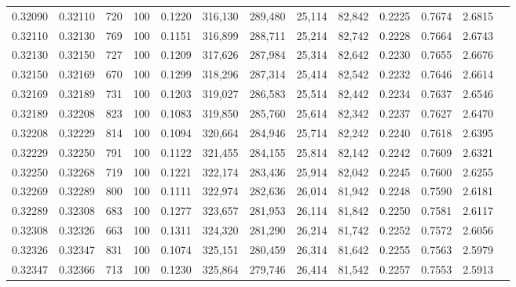 \begin{tabular}{rrrrrrrrrrrrr}
0.32090 & 0.32110 &   720 & 100 &                                     0.1220 & 316,130 & 289,480 &  25,114 &  82,842 & 0.2225 & 0.7674 & 2.6815 \\
0.32110 & 0.32130 &   769 & 100 &                                     0.1151 & 316,899 & 288,711 &  25,214 &  82,742 & 0.2228 & 0.7664 & 2.6743 \\
0.32130 & 0.32150 &   727 & 100 &                                     0.1209 & 317,626 & 287,984 &  25,314 &  82,642 & 0.2230 & 0.7655 & 2.6676 \\
0.32150 & 0.32169 &   670 & 100 &                                     0.1299 & 318,296 & 287,314 &  25,414 &  82,542 & 0.2232 & 0.7646 & 2.6614 \\
0.32169 & 0.32189 &   731 & 100 &                                     0.1203 & 319,027 & 286,583 &  25,514 &  82,442 & 0.2234 & 0.7637 & 2.6546 \\
0.32189 & 0.32208 &   823 & 100 &                                     0.1083 & 319,850 & 285,760 &  25,614 &  82,342 & 0.2237 & 0.7627 & 2.6470 \\
0.32208 & 0.32229 &   814 & 100 &                                     0.1094 & 320,664 & 284,946 &  25,714 &  82,242 & 0.2240 & 0.7618 & 2.6395 \\
0.32229 & 0.32250 &   791 & 100 &                                     0.1122 & 321,455 & 284,155 &  25,814 &  82,142 & 0.2242 & 0.7609 & 2.6321 \\
0.32250 & 0.32268 &   719 & 100 &                                     0.1221 & 322,174 & 283,436 &  25,914 &  82,042 & 0.2245 & 0.7600 & 2.6255 \\
0.32269 & 0.32289 &   800 & 100 &                                     0.1111 & 322,974 & 282,636 &  26,014 &  81,942 & 0.2248 & 0.7590 & 2.6181 \\
0.32289 & 0.32308 &   683 & 100 &                                     0.1277 & 323,657 & 281,953 &  26,114 &  81,842 & 0.2250 & 0.7581 & 2.6117 \\
0.32308 & 0.32326 &   663 & 100 &                                     0.1311 & 324,320 & 281,290 &  26,214 &  81,742 & 0.2252 & 0.7572 & 2.6056 \\
0.32326 & 0.32347 &   831 & 100 &                                     0.1074 & 325,151 & 280,459 &  26,314 &  81,642 & 0.2255 & 0.7563 & 2.5979 \\
0.32347 & 0.32366 &   713 & 100 &                                     0.1230 & 325,864 & 279,746 &  26,414 &  81,542 & 0.2257 & 0.7553 & 2.5913 \\

\end{tabular}
